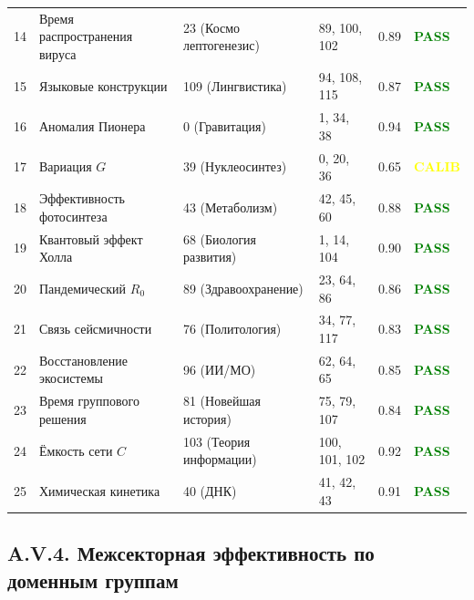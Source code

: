 \documentclass[11pt,a4paper]{article}
\begin{document}
\begin{longtable}{|p{0.8cm}|p{2.5cm}|p{1.8cm}|p{1.5cm}|p{1.5cm}|p{1.8cm}|}
		14 & Время распространения вируса & 23 (Космо лептогенезис) & 89, 100, 102 & 0.89 & \textcolor{green}{\textbf{PASS}} \\
		15 & Языковые конструкции & 109 (Лингвистика) & 94, 108, 115 & 0.87 & \textcolor{green}{\textbf{PASS}} \\
		16 & Аномалия Пионера & 0 (Гравитация) & 1, 34, 38 & 0.94 & \textcolor{green}{\textbf{PASS}} \\
		17 & Вариация $G$ & 39 (Нуклеосинтез) & 0, 20, 36 & 0.65 & \textcolor{yellow}{\textbf{CALIB}} \\
		18 & Эффективность фотосинтеза & 43 (Метаболизм) & 42, 45, 60 & 0.88 & \textcolor{green}{\textbf{PASS}} \\
		19 & Квантовый эффект Холла & 68 (Биология развития) & 1, 14, 104 & 0.90 & \textcolor{green}{\textbf{PASS}} \\
		20 & Пандемический $R_0$ & 89 (Здравоохранение) & 23, 64, 86 & 0.86 & \textcolor{green}{\textbf{PASS}} \\
		21 & Связь сейсмичности & 76 (Политология) & 34, 77, 117 & 0.83 & \textcolor{green}{\textbf{PASS}} \\
		22 & Восстановление экосистемы & 96 (ИИ/МО) & 62, 64, 65 & 0.85 & \textcolor{green}{\textbf{PASS}} \\
		23 & Время группового решения & 81 (Новейшая история) & 75, 79, 107 & 0.84 & \textcolor{green}{\textbf{PASS}} \\
		24 & Ёмкость сети $C$ & 103 (Теория информации) & 100, 101, 102 & 0.92 & \textcolor{green}{\textbf{PASS}} \\
		25 & Химическая кинетика & 40 (ДНК) & 41, 42, 43 & 0.91 & \textcolor{green}{\textbf{PASS}} \\
		\hline
	\end{longtable}
	
	\subsection*{A.V.4. Межсекторная эффективность по доменным группам}
	
\end{document}
